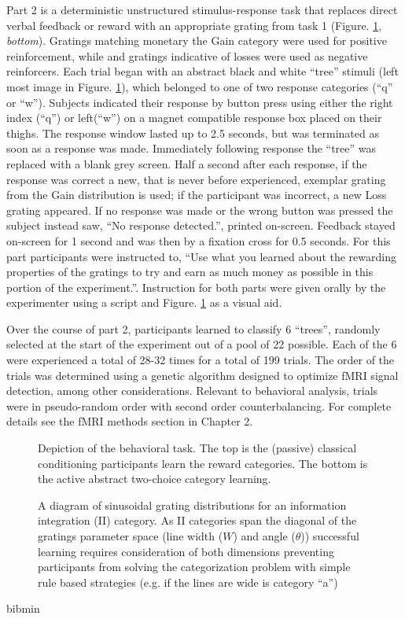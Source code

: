 \documentclass[doc,12pt]{apa}        %
\begin{document}
Part 2 is a deterministic unstructured stimulus-response task that replaces direct verbal feedback or reward with an appropriate grating from task 1  (Figure. \ref{fig:task}, \emph{bottom}).  Gratings matching monetary the Gain category were used for positive reinforcement, while and gratings indicative of losses were used as negative reinforcers.   Each trial began with an abstract black and white ``tree'' stimuli (left most image in Figure. \ref{fig:task}), which belonged to one of two response categories (``q'' or ``w'').  Subjects indicated their response by button press using either the right index (``q'') or left(``w'') on a magnet compatible response box placed on their thighs.  The response window lasted up to 2.5 seconds, but was terminated as soon as a response was made.  Immediately following response the ``tree'' was replaced with a blank grey screen.  Half a second after each response, if the response was correct a new, that is never before experienced, exemplar grating from the Gain distribution is used; if the participant was incorrect, a new Loss grating appeared.  If no response was made or the wrong button was pressed the subject instead saw, ``No response detected.'', printed on-screen.  Feedback stayed on-screen for 1 second and was then by a fixation cross for 0.5 seconds.  For this part participants were instructed to, ``Use what you learned about the rewarding properties of the gratings to try and earn as much money as possible in this portion of the experiment.''.  Instruction for both parts were given orally by the experimenter using a script and Figure. \ref{fig:task} as a visual aid.

Over the course of part 2, participants learned to classify 6 ``trees'', randomly selected at the start of the experiment out of a pool of 22 possible.  Each of the 6 were experienced a total of 28-32 times for a total of 199 trials. The order of the trials was determined using a genetic algorithm designed to optimize fMRI signal detection, among other considerations.  Relevant to behavioral analysis, trials were in pseudo-random order with second order counterbalancing.  For complete details see the fMRI methods section in Chapter 2.

\begin{figure}[tp]
	\label{fig:task}
	\caption{Depiction of the behavioral task. The top is the (passive) classical conditioning participants learn the reward categories.  The bottom is the active abstract two-choice category learning.}
\end{figure}

\begin{figure}[tp]
	\label{fig:II}
	\caption{A diagram of sinusoidal grating distributions for an information integration (II) category.  As II categories span the diagonal of the gratings parameter space (line width ($W$) and angle ($\theta$)) successful learning requires consideration of both dimensions preventing participants from solving the categorization problem with simple rule based strategies (e.g. if the lines are wide is category ``a'')}
\end{figure}


\newpage
 {bibmin}
\end{document}
